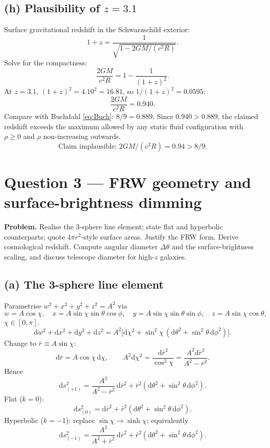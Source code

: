 \documentclass[11pt]{article}
\newcommand{\de}{\mathrm{d}}
\begin{document}
\subsection*{(h) Plausibility of $z = 3.1$}

Surface gravitational redshift in the Schwarzschild exterior:
\[
1 + z = \frac{1}{\sqrt{1 - 2GM/(c^2 R)}}.
\]
Solve for the compactness:
\[
\frac{2GM}{c^2 R} = 1 - \frac{1}{(1+z)^2}.
\]
At $z = 3.1$, $(1+z)^2 = 4.10^2 = 16.81$, so $1/(1+z)^2 = 0.0595$:
\[
\frac{2GM}{c^2 R} = 0.940.
\]
Compare with Buchdahl \eqref{eq:Buch}: $8/9 = 0.889$. Since $0.940 > 0.889$, the claimed redshift exceeds the maximum allowed by any static fluid configuration with $\rho\ge 0$ and $\rho$ non-increasing outwards.
\[
\boxed{\;\text{Claim implausible: } 2GM/(c^2 R) = 0.94 > 8/9.\;}
\]

\section*{Question 3 --- FRW geometry and surface-brightness dimming}

\textbf{Problem.} Realise the 3-sphere line element; state flat and hyperbolic counterparts; quote $4\pi r^2$-style surface areas. Justify the FRW form. Derive cosmological redshift. Compute angular diameter $\Delta\theta$ and the surface-brightness scaling, and discuss telescope diameter for high-$z$ galaxies.

\subsection*{(a) The 3-sphere line element}

Parametrise $w^2+x^2+y^2+z^2 = A^2$ via
\[
w = A\cos\chi,\quad x = A\sin\chi\sin\theta\cos\phi,\quad y = A\sin\chi\sin\theta\sin\phi,\quad z = A\sin\chi\cos\theta,
\]
$\chi\in[0,\pi]$.
\[
\de w^2 + \de x^2 + \de y^2 + \de z^2 = A^2\bigl[\de\chi^2 + \sin^2\chi\,(\de\theta^2 + \sin^2\theta\,\de\phi^2)\bigr].
\]
Change to $\bar r \equiv A\sin\chi$:
\[
\de\bar r = A\cos\chi\,\de\chi,\qquad A^2\de\chi^2 = \frac{\de\bar r^2}{\cos^2\chi} = \frac{A^2\de\bar r^2}{A^2-\bar r^2}.
\]
Hence
\[
\boxed{\;\de s^2_{(+1)} = \frac{A^2}{A^2-\bar r^2}\,\de\bar r^2 + \bar r^2(\de\theta^2 + \sin^2\theta\,\de\phi^2).\;}
\]
Flat ($k=0$):
\[
\de s^2_{(0)} = \de\bar r^2 + \bar r^2(\de\theta^2 + \sin^2\theta\,\de\phi^2).
\]
Hyperbolic ($k=-1$): replace $\sin\chi\to\sinh\chi$; equivalently
\[
\de s^2_{(-1)} = \frac{A^2}{A^2+\bar r^2}\,\de\bar r^2 + \bar r^2(\de\theta^2 + \sin^2\theta\,\de\phi^2).
\]
\end{document}

